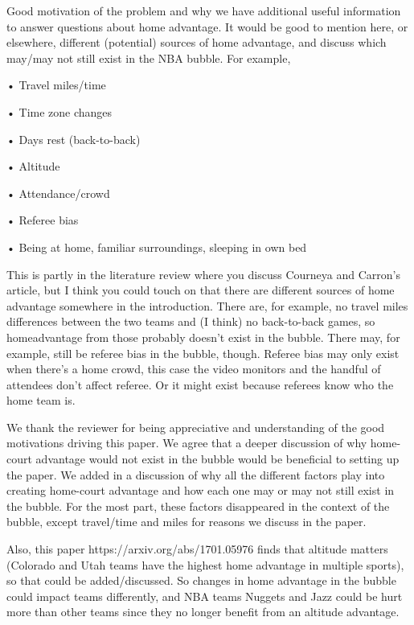 \documentclass[12pt]{article}
\newenvironment{comment}%
{\begin{quoting}\noindent\small\it\ignorespaces%
  }{\end{quoting}}
\begin{document}
\begin{comment}
Good motivation of the problem and why we have additional useful information
to answer questions about
home advantage.
It would be good to mention here, or elsewhere, different (potential) 
sources of home advantage, and discuss
which may/may not still exist in the NBA bubble. For example,
\item
• Travel miles/time
\item
• Time zone changes
\item
• Days rest (back-to-back)
\item
• Altitude
\item
• Attendance/crowd
\item
• Referee bias
\item
• Being at home, familiar surroundings, sleeping in own bed
\item
This is partly in the literature review where you discuss Courneya and Carron’s article,
but I think you could touch on that there are different sources of home advantage 
somewhere in the introduction. There are, for example, no travel miles differences between the 
two teams and (I think) no back-to-back games, so homeadvantage from those probably doesn’t 
exist in the bubble. There may, for example, still be referee bias in
the bubble, though. Referee bias may only exist when there’s a home crowd, this
case the video monitors and the handful of attendees don’t affect referee. 
Or it might exist because referees know who the home team is.
\end{comment}

 We thank the reviewer for being appreciative and understanding of the 
 good motivations driving this paper. We agree that a deeper discussion 
 of why home-court advantage would not exist in the bubble would be beneficial 
 to setting up the paper. We added in a discussion of why all the different 
 factors play into creating home-court advantage and how each one may or may 
 not still exist in the bubble. For the most part, these factors disappeared 
 in the context of the bubble, except travel/time and miles for reasons we
 discuss in the paper. 

\begin{comment}
Also, this paper https://arxiv.org/abs/1701.05976 finds that altitude matters
(Colorado and Utah teams have the highest home advantage in multiple sports),
so that could be added/discussed. So changes in home advantage in the bubble
could impact teams differently, and NBA teams Nuggets and Jazz could be hurt
more than other teams since they no longer benefit from an altitude advantage.
\end{comment}
\end{document}
